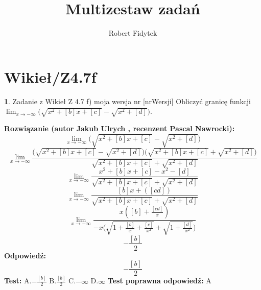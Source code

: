\documentclass[12pt, a4paper]{article}
\title{Multizestaw zadań}
\author{Robert Fidytek}
\date{}
\theoremstyle{definition} %
\newtheorem{zad}{}
\newcommand{\kategoria}[1]{\section{#1}} %
\newcommand{\zadStart}[1]{\begin{zad}#1\newline} %
\newcommand{\zadStop}{\end{zad}}   %
\newcommand{\rozwStart}[2]{\noindent \textbf{Rozwiązanie (autor #1 , recenzent #2): }\newline} %
\newcommand{\rozwStop}{\newline}                                            %
\newcommand{\odpStart}{\noindent \textbf{Odpowiedź:}\newline}    %
\newcommand{\odpStop}{\newline}                                             %
\newcommand{\testStart}{\noindent \textbf{Test:}\newline} %
\newcommand{\testStop}{\newline} %
\newcommand{\kluczStart}{\noindent \textbf{Test poprawna odpowiedź:}\newline} %
\newcommand{\kluczStop}{\newline} %
\begin{document}
\maketitle


\kategoria{Wikieł/Z4.7f}
\zadStart{Zadanie z Wikieł Z 4.7 f) moja wersja nr [nrWersji]}
Obliczyć granicę funkcji $\lim_{x \to -\infty}\big(\sqrt{x^{2}+[b]x+[c]}-\sqrt{x^{2}+[d]}\big)$.
\zadStop
\rozwStart{Jakub Ulrych}{Pascal Nawrocki}
$$\lim_{x \to -\infty}\big(\sqrt{x^{2}+[b]x+[c]}-\sqrt{x^{2}+[d]}\big)$$
$$\lim_{x \to -\infty}\frac{\big(\sqrt{x^{2}+[b]x+[c]}-\sqrt{x^{2}+[d]}\big)\big(\sqrt{x^{2}+[b]x+[c]}+\sqrt{x^{2}+[d]}\big)}{\sqrt{x^{2}+[b]x+[c]}+\sqrt{x^{2}+[d]}}$$
$$\lim_{x \to -\infty}\frac{x^{2}+[b]x+[c]-x^{2}-[d]}{\sqrt{x^{2}+[b]x+[c]}+\sqrt{x^{2}+[d]}}$$
$$\lim_{x \to -\infty}\frac{[b]x+([cd])}{\sqrt{x^{2}+[b]x+[c]}+\sqrt{x^{2}+[d]}}$$
$$\lim_{x \to -\infty}\frac{x([b]+\frac{[cd]}{x})}{-x\big(\sqrt{1+\frac{[b]}{x}+\frac{[c]}{x^{2}}}+\sqrt{1+\frac{[d]}{x^{2}}}\big)}$$
$$-\frac{[b]}{2}$$
\rozwStop
\odpStart
$$-\frac{[b]}{2}$$
\odpStop
\testStart
A.$-\frac{[b]}{2}$
B.$\frac{[b]}{2}$
C.$-\infty$
D.$\infty$
\testStop
\kluczStart
A
\kluczStop
\end{document}
